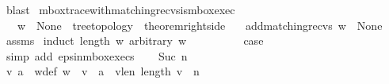 \begin{isabellebody}
\ blast\isanewline
{}\isamarkupfalse%
%
\endisatagproof
{\isafoldproof}%
%
\isadelimproof
\isanewline
%
\endisadelimproof
\isanewline
\isanewline
\isanewline
\isanewline
\isanewline
\isanewline
\isanewline
{}\isamarkupfalse%
\ mbox{\isacharunderscore}{\kern0pt}trace{\isacharunderscore}{\kern0pt}with{\isacharunderscore}{\kern0pt}matching{\isacharunderscore}{\kern0pt}recvs{\isacharunderscore}{\kern0pt}is{\isacharunderscore}{\kern0pt}mbox{\isacharunderscore}{\kern0pt}exec{\isacharcolon}{\kern0pt}\isanewline
\ \ \ {\isachardoublequoteopen}w\ {\isasymin}\ {\isasymT}\isactrlbsub None\isactrlesub {\isasymdownharpoonright}\isactrlsub {\isacharbang}{\kern0pt}{\isachardoublequoteclose}\ \ {\isachardoublequoteopen}tree{\isacharunderscore}{\kern0pt}topology{\isachardoublequoteclose}\ \ {\isachardoublequoteopen}theorem{\isacharunderscore}{\kern0pt}rightside{\isachardoublequoteclose}\isanewline
\ \ \ {\isachardoublequoteopen}{\isacharparenleft}{\kern0pt}add{\isacharunderscore}{\kern0pt}matching{\isacharunderscore}{\kern0pt}recvs\ w{\isacharparenright}{\kern0pt}\ {\isasymin}\ {\isasymT}\isactrlbsub None\isactrlesub {\isachardoublequoteclose}\isanewline
%
\isadelimproof
\ \ %
\endisadelimproof
%
\isatagproof
{}\isamarkupfalse%
\ assms\isanewline
{}\isamarkupfalse%
\ {\isacharparenleft}{\kern0pt}induct\ {\isachardoublequoteopen}length\ w{\isachardoublequoteclose}\ arbitrary{\isacharcolon}{\kern0pt}\ w{\isacharparenright}{\kern0pt}\isanewline
\ \ \isamarkupfalse%
\ {}\isanewline
\ \ \isamarkupfalse%
\ \isamarkupfalse%
\ {\isacharquery}{\kern0pt}case\ \isamarkupfalse%
\ {\isacharparenleft}{\kern0pt}simp\ add{\isacharcolon}{\kern0pt}\ eps{\isacharunderscore}{\kern0pt}in{\isacharunderscore}{\kern0pt}mbox{\isacharunderscore}{\kern0pt}execs{\isacharparenright}{\kern0pt}\isanewline
{}\isamarkupfalse%
\isanewline
\ \ \isamarkupfalse%
\ {\isacharparenleft}{\kern0pt}Suc\ n{\isacharparenright}{\kern0pt}\isanewline
\ \ \ \ \isanewline
\ \ \isamarkupfalse%
\ \isamarkupfalse%
\ v\ a\ \ w{\isacharunderscore}{\kern0pt}def{\isacharcolon}{\kern0pt}\ {\isachardoublequoteopen}w\ {\isacharequal}{\kern0pt}\ v\ {\isasymsqdot}\ {\isacharbrackleft}{\kern0pt}a{\isacharbrackright}{\kern0pt}{\isachardoublequoteclose}\ \ v{\isacharunderscore}{\kern0pt}len{\isacharcolon}{\kern0pt}\ {\isachardoublequoteopen}length\ v\ {\isacharequal}{\kern0pt}\ n{\isachardoublequoteclose}\ \isamarkupfalse%

\end{isabellebody}

